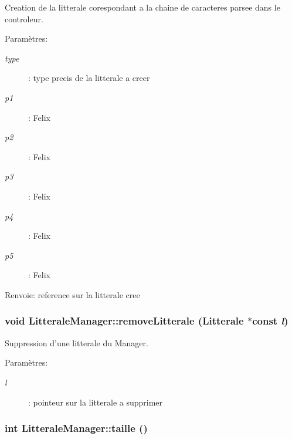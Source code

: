 Creation de la litterale corespondant a la chaine de caracteres parsee dans le controleur. 

\begin{Desc}
\item[Paramètres:]
\begin{description}
\item[{\em type}]: type precis de la litterale a creer \item[{\em p1}]: Felix \item[{\em p2}]: Felix \item[{\em p3}]: Felix \item[{\em p4}]: Felix \item[{\em p5}]: Felix \end{description}
\end{Desc}
\begin{Desc}
\item[Renvoie:]reference sur la litterale cree \end{Desc}
\hypertarget{class_litterale_manager_53bfb9871eed94f6c3e8f5f1e2a76e29}{
\subsubsection[{removeLitterale}]{\setlength{\rightskip}{0pt plus 5cm}void LitteraleManager::removeLitterale ({\bf Litterale} $\ast$const  {\em l})}}
\label{class_litterale_manager_53bfb9871eed94f6c3e8f5f1e2a76e29}


Suppression d'une litterale du Manager. 

\begin{Desc}
\item[Paramètres:]
\begin{description}
\item[{\em l}]: pointeur sur la litterale a supprimer \end{description}
\end{Desc}
\hypertarget{class_litterale_manager_1395437a2113d2dbcfcdd90891af370e}{
\subsubsection[{taille}]{\setlength{\rightskip}{0pt plus 5cm}int LitteraleManager::taille ()}}
\label{class_litterale_manager_1395437a2113d2dbcfcdd90891af370e}


